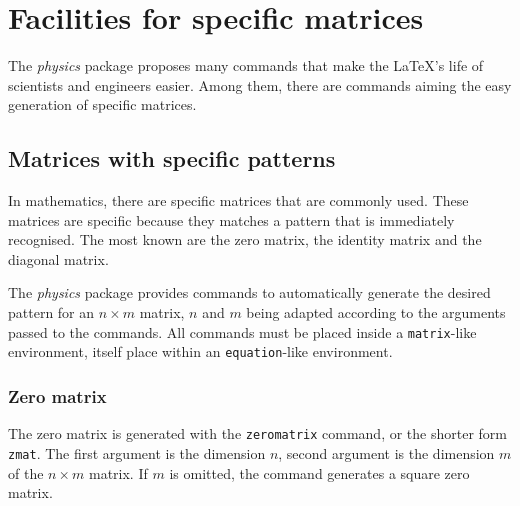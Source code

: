 \section{Facilities for specific matrices}


	The \emph{physics} package proposes many commands that make the \LaTeX{}'s life of scientists and engineers easier.
	Among them, there are commands aiming the easy generation of specific matrices.
	
	
	
	\subsection{Matrices with specific patterns}
	
		
		In mathematics, there are specific matrices that are commonly used.
		These matrices are specific because they matches a pattern that is immediately recognised.
		The most known are the zero matrix, the identity matrix and the diagonal matrix.
		
		The \emph{physics} package provides commands to automatically generate the desired pattern for an $n \times m$ matrix, $n$ and $m$ being adapted according to the arguments passed to the commands.
		All commands must be placed inside a \texttt{matrix}-like environment, itself place within an \texttt{equation}-like environment.
		
		
		
		\subsubsection{Zero matrix}
		
		
			The zero matrix is generated with the \texttt{zeromatrix} command, or the shorter form \texttt{zmat}.
			The first argument is the dimension $n$, second argument is the dimension $m$ of the $n \times m$ matrix.
			If $m$ is omitted, the command generates a square zero matrix.
			
